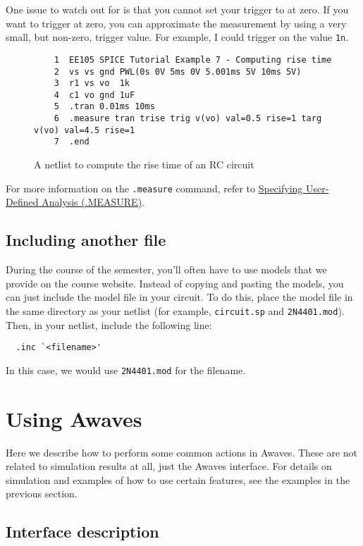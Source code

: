 \documentclass{article}
\begin{document}
One issue to watch out for is that you cannot set your trigger to at zero. If you want to trigger at zero, you can approximate the measurement by using a very small, but non-zero, trigger value. For example, I could trigger on the value \texttt{1n}.

\begin{figure}[!htb]
  \begin{verbatim}
    1  EE105 SPICE Tutorial Example 7 - Computing rise time
    2  vs vs gnd PWL(0s 0V 5ms 0V 5.001ms 5V 10ms 5V)
    3  r1 vs vo  1k
    4  c1 vo gnd 1uF
    5  .tran 0.01ms 10ms
    6  .measure tran trise trig v(vo) val=0.5 rise=1 targ v(vo) val=4.5 rise=1
    7  .end \end{verbatim}
  \caption{A netlist to compute the rise time of an RC circuit}
  \label{risetime}
\end{figure}

For more information on the \verb|.measure| command, refer to \href{http://www.ece.uci.edu/docs/hspice/hspice_2001_2-48.html}{Specifying User-Defined Analysis (.MEASURE)}.

\subsection{Including another file}

During the course of the semester, you'll often have to use models that we provide on the course website. Instead of copying and pasting the models, you can just include the model file in your circuit. To do this, place the model file in the same directory as your netlist (for example, \verb|circuit.sp| and \verb|2N4401.mod|). Then, in your netlist, include the following line:

\begin{verbatim}
  .inc `<filename>'
\end{verbatim}
In this case, we would use \verb|2N4401.mod| for the filename. 

\section{Using Awaves}

Here we describe how to perform some common actions in Awaves. These are not related to simulation results at all, just the Awaves interface. For details on simulation and examples of how to use certain features, see the examples in the previous section.

\subsection{Interface description}
\end{document}
